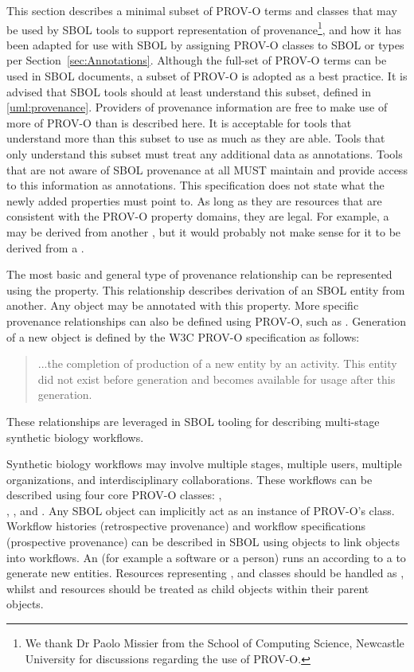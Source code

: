 This section describes a minimal subset of PROV-O terms and classes that may be used by SBOL tools to support representation of provenance\footnote{We thank Dr Paolo Missier from the School of Computing Science, Newcastle University for discussions regarding the use of PROV-O.},
and how it has been adapted for use with SBOL by assigning PROV-O classes to SBOL  or  types per  Section~\ref{sec:Annotations}.
%
 Although the full-set of PROV-O terms can be used in SBOL documents, a subset of PROV-O is adopted as a best practice. It is advised that SBOL tools should at least understand this subset, defined in \ref{uml:provenance}. Providers of provenance information are free to make use of more of PROV-O than is described here. It is acceptable for tools that understand more than this subset to use as much as they are able. Tools that only understand this subset must treat any additional data as annotations. Tools that are not aware of SBOL provenance at all MUST maintain and provide access to this information as annotations. This specification does not state what the newly added properties must point to. As long as they are resources that are consistent with the PROV-O property domains, they are legal. For example, a  may be derived from another , but it would probably not make sense for it to be derived from a .

The most basic and general type of provenance relationship can be represented using the  property. This relationship describes derivation of an SBOL entity from another.
Any  object may be annotated with this property. More specific provenance relationships can also be defined using PROV-O, such as . Generation of a new object is defined by the W3C PROV-O specification as follows:
\begin{quote}
	...the completion of production of a new entity by an activity. This entity did not exist before generation and becomes available for usage after this generation.
\end{quote}
These relationships are leveraged in SBOL tooling for describing multi-stage synthetic biology workflows.

Synthetic biology workflows may involve multiple stages, multiple users, multiple organizations, and interdisciplinary collaborations. These workflows can be described using four core PROV-O classes: , \\ , , and . Any SBOL  object can implicitly act as an instance of PROV-O's  class. Workflow histories (retrospective provenance) and workflow specifications (prospective provenance) can be described in SBOL using  objects to link  objects into workflows. An  (for example a software or a person) runs an  according to a  to generate new entities. Resources representing ,  and  classes should be handled as , whilst  and  resources should be treated as child  objects within their parent  objects.


